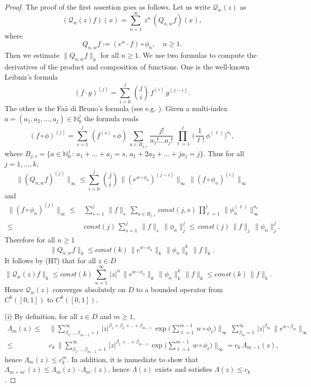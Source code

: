 \documentclass[11pt]{amsart}
\theoremstyle{definition}
\theoremstyle{remark}
\theoremstyle{definition}
\numberwithin{equation}{section}
\newcommand{\N}{\mathbb N}
\newcommand{\QQ}{\mathcal{Q}}
\begin{document}
\begin{proof}
The proof of the first assertion goes as follows.
Let us write $\QQ_w(z)$ as 
\[
(\QQ_w(z)f)(x) = \sum_{n=1}^\infty\, z^n\, (Q_{n,w} f)(x),
\]
where
\begin{equation}\label{notat-Qn}
Q_{n,w} f:= (e^w \cdot f) \circ \phi_n, \quad n\ge 1.
\end{equation}
Then we estimate $\|Q_{n,w} f\|_k$ for all $n\ge 1$. We use two formulas to compute the derivatives of the product and composition of functions. One is the well-known Leibniz's formula 
\[
(f\cdot g)^{(j)} = \sum_{i=0}^j\, {j \choose i}\, f^{(i)}\, g^{(j-i)}.
\]
The other is the Fa\`a di Bruno's formula (see e.g. \cite{Faa}). Given a multi-index $a=(a_1,a_2,\dots,a_j) \in \N_0^j$ the formula reads
\[
(f\circ \phi)^{(j)} = \sum_{s=1}^j\, (f^{(s)} \circ \phi)\, \sum_{a \in B_{j,s}}\, \frac{j!}{a_1!\dots a_j!}\, \prod_{\ell=1}^j\, \Big( \frac{1}{\ell!}\, \phi^{(\ell)} \Big)^{a_\ell},
\]
where $B_{j,s} = \{ a\in \N_0^j\, :\, a_1+\dots+a_j=s,\, a_1+2a_2+\dots+ja_j=j\}$. Thus for all $j=1,\dots,k$, 
\[
\| (Q_{n,w} f)^{(j)}\|_\infty \le \sum_{i=0}^j\, {j \choose i}\, \| (e^{w\circ \phi_n})^{(j-i)}\|_\infty \, \| (f\circ \phi_n)^{(i)}\|_\infty
\]
and
\[
\begin{aligned}
\| (f\circ \phi_n)^{(j)}\|_\infty \le\, & \sum_{s=1}^j\, \| f \|_s \, \sum_{a \in B_{j,s}}\, const(j,s)\, \prod_{\ell=1}^j\, \| \phi_n^{(\ell)} \|_\infty^{a_\ell} \\
\le\, & const(j)\, \sum_{s=1}^j\, \| f \|_s\, \| \phi_n\|_j^j \le\, const(j)\, \| f \|_j\, \| \phi_n\|_j^j.
\end{aligned}
\]
Therefore for all $n\ge 1$
\[
\| Q_{n,w} f \|_k \le const(k)\, \| e^{w\circ \phi_n} \|_k \, \| \phi_n\|_k^k\, \| f \|_k.
\]
It follows by (H7) that for all $z\in D$
\[
\| \QQ_w(z)f \|_k \le const(k)\, \sum_{n=1}^\infty\, |z|^n\, \| e^{w\circ \phi_n} \|_k \, \| \phi_n\|_k^k\, \| f \|_k \le const(k)\, \| f \|_k.
\] 
Hence $\QQ_w(z)$ converges absolutely on $D$ to a bounded operator from $C^k([0,1])$ to $C^k([0,1])$.

(i) By definition, for all $z\in D$ and $m\ge 1$,
\[
\begin{aligned}
\Lambda_m(z) \le\, & \Big\| \sum_{\beta_1,..,\beta_{m-1}=1}^\infty\, |z|^{\beta_1+\beta_2+..+\beta_{m-1}}\, \exp\Big(\sum_{\ell=1}^{m-1}\, w\circ \phi_\ell\Big) \Big\|_\infty \, \sum_{\beta_m=1}^\infty\, |z|^{\beta_m}\, \| e^{w\circ \beta_{m}} \|_\infty\\
\le\, & c_k \, \Big\| \sum_{\beta_1,..,\beta_{m-1}=1}^\infty\, |z|^{\beta_1+..+\beta_{m-1}}\, \exp\Big(\sum_{\ell=1}^{m-1}\, w\circ \phi_\ell\Big) \Big\|_\infty = c_k\, \Lambda_{m-1}(z),
\end{aligned}
\]
hence $\Lambda_m(z) \le c_k^m$. In addition, it is immediate to show that $\Lambda_{m+m'}(z) \le \Lambda_m(z)\cdot \Lambda_{m'}(z)$, hence $\Lambda(z)$ exists and satisfies $\Lambda(z) \le c_k$.


\end{proof}
\end{document}
